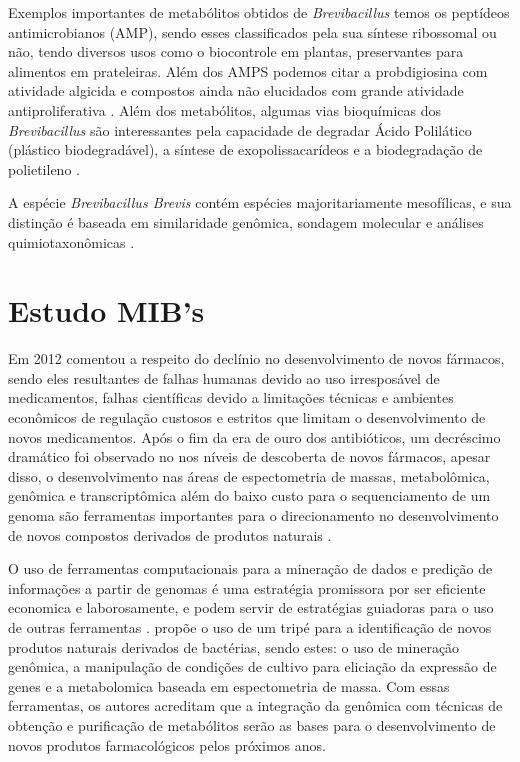 Exemplos importantes de metabólitos obtidos de \textit{Brevibacillus} temos os peptídeos antimicrobianos (AMP),
sendo esses classificados pela sua síntese ribossomal ou não, tendo diversos usos como o biocontrole em plantas, preservantes
para alimentos em prateleiras\cite{yang2018antimicrobial}. Além dos AMPS podemos citar a probdigiosina com atividade algicida e compostos ainda não
elucidados com grande atividade antiproliferativa \cite{zhang2022transcriptome,arumugam2018isolation}.
Além dos metabólitos, algumas vias bioquímicas dos \textit{Brevibacillus} são interessantes pela capacidade de
degradar Ácido Polilático (plástico biodegradável), a síntese de exopolissacarídeos e a 
biodegradação de polietileno \cite{yu2022comparison,yildiz2015genomic,hadad2005biodegradation,ali2022screening}.

A espécie \textit{Brevibacillus Brevis} contém espécies majoritariamente mesofílicas, e
sua distinção é baseada em similaridade genômica, sondagem molecular e análises 
quimiotaxonômicas \cite{ray2020brevibacillus}.  

\section{Estudo MIB's}
Em 2012  comentou a respeito do declínio no desenvolvimento de novos
fármacos, sendo eles resultantes de falhas humanas devido ao uso irresposável de medicamentos,
falhas científicas devido a limitações técnicas e ambientes econômicos de regulação custosos e estritos
que limitam o desenvolvimento de novos medicamentos.
Após o fim da era de ouro dos antibióticos, um decréscimo dramático foi observado no nos níveis
de descoberta de novos fármacos, apesar disso, o desenvolvimento nas áreas de espectometria de massas,
metabolômica, genômica e transcriptômica além do baixo custo para o sequenciamento de um genoma são
ferramentas importantes para o direcionamento no desenvolvimento de novos compostos derivados de produtos naturais \cite{katz2016natural}. 

O uso de ferramentas computacionais para a mineração 
de dados e predição de informações a partir de genomas é uma estratégia promissora por ser
eficiente economica e laborosamente, e podem servir de estratégias guiadoras para o uso de outras 
ferramentas \cite{adamek2017mining}.  propõe o uso de um tripé para a identificação de novos produtos
naturais derivados de bactérias, sendo estes: o uso de mineração genômica, a manipulação de condições
de cultivo para eliciação da expressão de genes e a metabolomica baseada em espectometria de massa. Com
essas ferramentas, os autores acreditam que a integração da genômica com técnicas de obtenção e purificação
de metabólitos serão as bases para o desenvolvimento de novos produtos farmacológicos pelos próximos anos.

